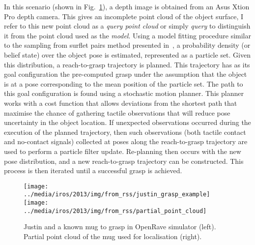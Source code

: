 In this scenario (shown in Fig.~\ref{fig:spam.example}), a depth image is obtained from an Asus Xtion Pro depth camera. This gives an incomplete point cloud of the object surface, I refer to this new point cloud as a \emph{query point cloud} or simply \emph{query} to distinguish it from the point cloud used as the \emph{model}. Using a model fitting procedure similar to the sampling from surflet pairs method presented in~\citep{bib:uli_cviu_2011}, a probability density (or belief state) over the object pose is estimated, represented as a particle set. Given this distribution, a reach-to-grasp trajectory is planned. This trajectory has as its goal configuration the pre-computed grasp under the assumption that the object is at a pose corresponding to the mean position of the particle set. The path to this goal configuration is found using a stochastic motion planner. This planner works with a cost function that allows deviations from the shortest path that maximise the chance of gathering tactile observations that will reduce pose uncertainty in the object location. If unexpected observations occurred during the execution of the planned trajectory, then such observations (both tactile contact and no-contact signals) collected at poses along the reach-to-grasp trajectory are used to perform a particle filter update. Re-planning then occurs with the new pose distribution, and a new reach-to-grasp trajectory can be constructed. This process is then iterated until a successful grasp is achieved.
	
\begin{figure}[!t]
\centerline{
\texttt{[image: ../media/iros/2013/img/from\_rss/justin\_grasp\_example]}
\texttt{[image: ../media/iros/2013/img/from\_rss/partial\_point\_cloud]}
}
\caption[Grasp example:]{Justin and a known mug to grasp in OpenRave simulator (left). Partial point cloud of the mug used for localisation (right).}
\label{fig:spam.example}
\end{figure}


